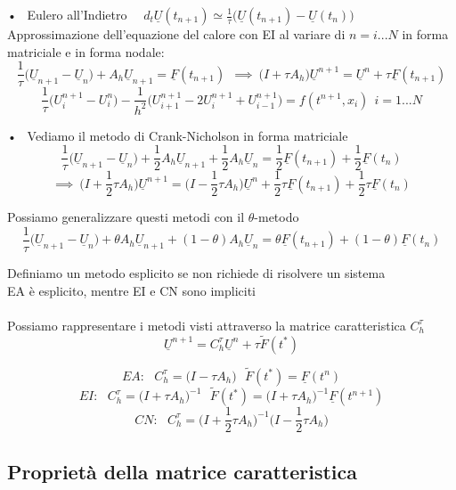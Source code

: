 \documentclass{article}
\renewcommand{\vv}[1]{\underline{#1}}
\begin{document}
\phantom{}

• \ Eulero all'Indietro \ \ $d_t \vv{U}(t_{n+1})\simeq \frac{1}{\tau}\big(\vv{U}(t_{n+1})-\vv{U}(t_n)\big)$\\
Approssimazione dell'equazione del calore con EI al variare di $n=i...N$ in forma matriciale e in forma nodale:
\[
\frac{1}{\tau}\big(\vv{U}_{n+1}-\vv{U}_n\big) + A_h\vv{U}_{n+1} = \vv{F}(t_{n+1}) \ \ \implies \ \big( I+\tau A_h \big)\vv{U}^{n+1}=\vv{U}^n + \tau \vv{F}(t_{n+1})
\]
\[
\frac{1}{\tau}\big(U_i^{n+1}-U_i^n\big) - \frac{1}{h^2}\big( U_{i+1}^{n+1} - 2U_i^{n+1} + U_{i-1}^{n+1} \big) = f(t^{n+1},x_i) \ \ i=1...N
\]

\phantom{}

• \ Vediamo il metodo di Crank-Nicholson in forma matriciale
\[
\frac{1}{\tau}\big(\vv{U}_{n+1}-\vv{U}_n\big) + \frac12 A_h\vv{U}_{n+1} +\frac12 A_h\vv{U}_n  = \frac12 \vv{F}(t_{n+1}) + \frac12 \vv{F}(t_n)  \] \[ \implies \ \big(I+\frac12 \tau A_h \big)\vv{U}^{n+1}= \big( I-\frac12 \tau A_h \big) \vv{U}^n +\frac12 \tau \vv{F}(t_{n+1}) +\frac12 \tau \vv{F}(t_n) 
\]

\phantom{}

Possiamo generalizzare questi metodi con il $\theta$-metodo
\[
\frac{1}{\tau}\big(\vv{U}_{n+1}-\vv{U}_n\big) + \theta A_h\vv{U}_{n+1} +(1-\theta) A_h\vv{U}_n  = \theta \vv{F}(t_{n+1}) +(1-\theta) \vv{F}(t_n)  
\]

\phantom{}


Definiamo un metodo esplicito se non richiede di risolvere un sistema\\
EA è esplicito, mentre EI e CN sono impliciti \\ \\


Possiamo rappresentare i metodi visti attraverso la matrice caratteristica $C_h^{\tau}$
\[
\vv{U}^{n+1}=C_h^{\tau} \vv{U}^n + \tau \tilde{F}(t^*)
\]

\[
EA: \ \ \ C_h^{\tau}=\big( I-\tau A_h \big) \ \ \ \tilde{F}(t^*)=\vv{F}(t^n)
\]
\[
EI: \ \ \ C_h^{\tau}=\big( I+\tau A_h \big)^{-1} \ \ \ \tilde{F}(t^*)=\big( I+\tau A_h \big)^{-1}\vv{F}(t^{n+1})
\]
\[
CN: \ \ \ C_h^{\tau}=\big( I+\frac12 \tau A_h \big)^{-1}\big( I-\frac12 \tau A_h \big)
\]

\phantom{}


\subsection{Proprietà della matrice caratteristica}
\end{document}
